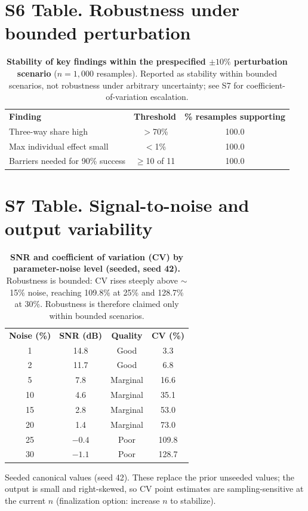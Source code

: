 \documentclass[10pt,letterpaper]{article}
\newlength\savedwidth
\newcommand\thickhline{\noalign{\global\savedwidth\arrayrulewidth\global\arrayrulewidth 2pt}\hline\noalign{\global\arrayrulewidth\savedwidth}}
\begin{document}
\section*{S6 Table. Robustness under bounded perturbation}
\begin{table}[!ht]\centering
\caption{{\bf Stability of key findings within the prespecified $\pm10\%$ perturbation scenario} ($n=1{,}000$ resamples). Reported as stability within bounded scenarios, not robustness under arbitrary uncertainty; see S7 for coefficient-of-variation escalation.}
\label{S6}
\begin{tabular}{l c c}
\hline \textbf{Finding} & \textbf{Threshold} & \textbf{\% resamples supporting} \\ \thickhline
Three-way share high & $>$70\% & 100.0 \\
Max individual effect small & $<$1\% & 100.0 \\
Barriers needed for 90\% success & $\geq$10 of 11 & 100.0 \\ \hline
\end{tabular}
\end{table}

\section*{S7 Table. Signal-to-noise and output variability}
\begin{table}[!ht]\centering
\caption{{\bf SNR and coefficient of variation (CV) by parameter-noise level (seeded, seed 42).} Robustness is bounded: CV rises steeply above $\sim$15\% noise, reaching 109.8\% at 25\% and 128.7\% at 30\%. Robustness is therefore claimed only within bounded scenarios.}
\label{S7}
\begin{tabular}{c c c c}
\hline \textbf{Noise (\%)} & \textbf{SNR (dB)} & \textbf{Quality} & \textbf{CV (\%)} \\ \thickhline
1 & 14.8 & Good & 3.3 \\
2 & 11.7 & Good & 6.8 \\
5 & 7.8 & Marginal & 16.6 \\
10 & 4.6 & Marginal & 35.1 \\
15 & 2.8 & Marginal & 53.0 \\
20 & 1.4 & Marginal & 73.0 \\
25 & $-0.4$ & Poor & 109.8 \\
30 & $-1.1$ & Poor & 128.7 \\ \hline
\end{tabular}
\begin{flushleft}\footnotesize Seeded canonical values (seed 42). These replace the prior unseeded values; the output is small and right-skewed, so CV point estimates are sampling-sensitive at the current $n$ (finalization option: increase $n$ to stabilize).\end{flushleft}
\end{table}
\end{document}
